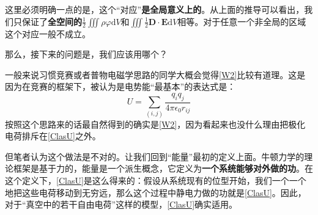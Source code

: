 \documentclass{ctexart}
\begin{document}
	这里必须明确一点的是，这个“对应”\textbf{是全局意义上的}。从上面的推导可以看出，我们只保证了\textbf{全空间的}$\frac{1}{2}\iiint \rho\varphi\mathrm dV$和$\iiint\frac{1}{2}\mathbf D\cdot\mathbf E\mathrm dV$相等。对于任意一个非全局的区域这个对应一般不成立。
	
	那么，接下来的问题是，我们应该用哪个？
	
	一般来说习惯竞赛或者普物电磁学思路的同学大概会觉得\eqref{W2}比较有道理。这是因为在竞赛的框架下，被认为是电势能“最基本”的表达式是：
	\begin{equation}\label{ClasU}
	U=\sum_{(i,j)}\frac{q_iq_j}{4\pi\epsilon_0 r_{ij}}
	\end{equation}
	按照这个思路来的话最自然得到的确实是\eqref{W2}，因为看起来也没什么理由把极化电荷排斥在\eqref{ClasU}之外。
	
	但笔者认为这个做法是不对的。让我们回到“能量”最初的定义上面。牛顿力学的理论框架是基于力的，能量是一个派生概念，它定义为\textbf{一个系统能够对外做的功}。在这个定义下，\eqref{ClasU}是这么得来的：假设从系统现有的位型开始，我们一个一个地把这些电荷移动到无穷远，那么这个过程中静电力做的功就是\eqref{ClasU}。因此，对于“真空中的若干自由电荷”这样的模型，\eqref{ClasU}确实适用。
	
\end{document}
